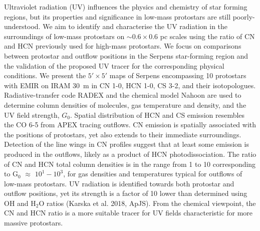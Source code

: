 \documentclass{aa}
\begin{document}
	
% 
  \abstract
   {Ultraviolet radiation (UV) influences the physics and chemistry of star forming regions,
   but its properties and significance in low-mass protostars are still poorly-understood.} 
   {We aim to identify and characterise the UV radiation in the surroundings of low-mass
   protostars on $\sim 0.6\times0.6$ pc scales
   using the ratio of CN and HCN previously used for high-mass protostars.
    We focus on comparisons between protostar and outflow positions in the Serpens star-forming 
    region and the validation of the proposed UV tracer for the corresponding physical 
    conditions.}
   {We present the $5'\times5'$ maps of Serpens encompassing 10 protostars with EMIR on IRAM 30~m 
   in CN 1-0, HCN 1-0, CS 3-2, and their isotopologues. Radiative-transfer code RADEX and 
   the chemical model Nahoon are used to determine column densities of molecules, gas temperature and density,
   and the UV field strength, $G_\mathrm{0}$.}
   {Spatial distribution of HCN and CS emission resembles the CO 6-5 from APEX tracing 
   outflows. CN emission is spatially associated with the positions of protostars, yet also 
   extends to their immediate surroundings. Detection of the line wings in CN profiles 
   suggest that at least some emission is produced in the outflows, likely as a product 
   of HCN photodissociation. The ratio of CN and HCN total column densities is in the range from 
   1 to 10 corresponding to G$_0$ $\approx$ $10^{1}-10^{3}$, for gas densities and 
   temperatures typical for outflows of low-mass protostars.}
   {UV radiation is identified towards both protostar and outflow positions,
    yet its strength is a factor of 10 lower than determined using OH and H$_2$O ratios 
    (Karska et al. 2018, ApJS). From the chemical viewpoint, the CN and HCN ratio 
    is a more suitable tracer for UV fields characteristic for more massive protostars.}
   

   \maketitle
%
%
\end{document}
